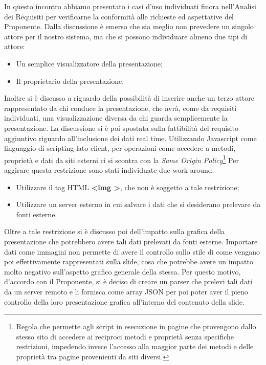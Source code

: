 In questo incontro abbiamo presentato i casi d'uso individuati finora nell'Analisi dei Requisiti per verificarne la conformità alle richieste ed aspettative del Proponente.
\noindent Dalla discussione è emerso che sia meglio non prevedere un singolo attore per il nostro sistema, ma che si possono individuare almeno due tipi di attore:
\begin{itemize}
	\item Un semplice visualizzatore della presentazione;
	\item Il proprietario della presentazione.
\end{itemize}
Inoltre si è discusso a riguardo della possibilità di inserire anche un terzo attore rappresentato da chi conduce la presentazione, che avrà, come da requisiti individuati, una visualizzazione diversa da chi guarda semplicemente la presentazione.
\noindent La discussione si è poi spostata sulla fattibilità del requisito aggiuntivo riguardo all'inclusione dei dati real time. Utilizzando Javascript come linguaggio di scripting lato client, per operazioni come accedere a metodi, proprietà e dati da siti esterni ci si scontra con la \textit{Same Origin Policy}\footnote{Regola che permette agli script in esecuzione in pagine che provengono dallo stesso sito di accedere ai reciproci metodi e proprietà senza specifiche restrizioni, impedendo invece l'accesso alla maggior parte dei metodi e delle proprietà tra pagine provenienti da siti diversi.}
Per aggirare questa restrizione sono stati individuate due work-around:
\begin{itemize}
	\item Utilizzare il tag HTML \textbf{<img >}, che non è soggetto a tale restrizione;
	\item Utilizzare un server esterno in cui salvare i dati che si desiderano prelevare da fonti esterne.
\end{itemize}   
Oltre a tale restrizione si è discusso poi dell'impatto sulla grafica della presentazione che potrebbero avere tali dati prelevati da fonti esterne. Importare dati come immagini non permette di avere il controllo sullo stile di come vengano poi effettivamente rappresentati sulla slide, cosa che potrebbe avere un impatto molto negativo sull'aspetto grafico generale della stessa. Per questo motivo, d'accordo con il Proponente, si è deciso di creare un parser che prelevi tali dati da un server remoto e li fornisca come array JSON per poi poter aver il pieno controllo della loro presentazione grafica all'interno del contenuto della slide.